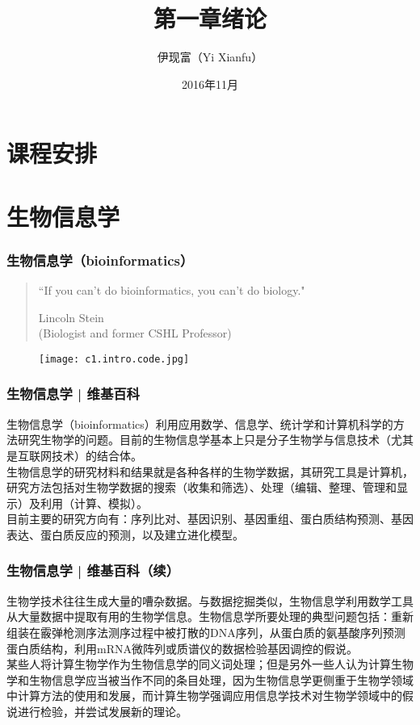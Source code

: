 



\title[绪论]{第一章\quad 绪论}
\author[Yixf]{伊现富（Yi Xianfu）}
\date{2016年11月}



\section{课程安排}


\section{生物信息学}
\begin{frame}
  \frametitle{生物信息学（bioinformatics）}
  \begin{quotation}
    ``If you can't do bioinformatics, you can't do biology."
    \begin{flushright}
    Lincoln Stein\\
    (Biologist and former CSHL Professor)
  \end{flushright}
  \end{quotation}
  \vspace{-1em}
  \begin{figure}
    \centering
    \texttt{[image: c1.intro.code.jpg]}
  \end{figure}
\end{frame}

\begin{frame}
  \frametitle{生物信息学 | 维基百科}
  生物信息学（bioinformatics）利用应用数学、信息学、统计学和计算机科学的方法研究生物学的问题。目前的生物信息学基本上只是分子生物学与信息技术（尤其是互联网技术）的结合体。\\
  \vspace{1em}
  生物信息学的研究材料和结果就是各种各样的生物学数据，其研究工具是计算机，研究方法包括对生物学数据的搜索（收集和筛选）、处理（编辑、整理、管理和显示）及利用（计算、模拟）。\\
  \vspace{1em}
  目前主要的研究方向有：序列比对、基因识别、基因重组、蛋白质结构预测、基因表达、蛋白质反应的预测，以及建立进化模型。
\end{frame}

\begin{frame}
  \frametitle{生物信息学 | 维基百科（续）}
  生物学技术往往生成大量的嘈杂数据。与数据挖掘类似，生物信息学利用数学工具从大量数据中提取有用的生物学信息。生物信息学所要处理的典型问题包括：重新组装在霰弹枪测序法测序过程中被打散的DNA序列，从蛋白质的氨基酸序列预测蛋白质结构，利用mRNA微阵列或质谱仪的数据检验基因调控的假说。\\
  \vspace{1em}
  某些人将计算生物学作为生物信息学的同义词处理；但是另外一些人认为计算生物学和生物信息学应当被当作不同的条目处理，因为生物信息学更侧重于生物学领域中计算方法的使用和发展，而计算生物学强调应用信息学技术对生物学领域中的假说进行检验，并尝试发展新的理论。
\end{frame}


